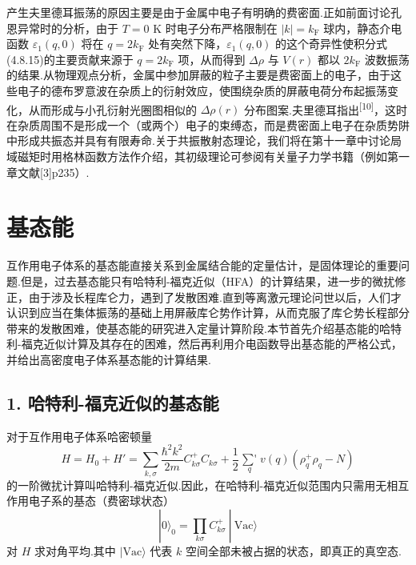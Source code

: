 产生夫里德耳振荡的原因主要是由于金属中电子有明确的费密面.正如前面讨论孔恩异常时的分析，由于 $T=0$ K 时电子分布严格限制在 $|k|=k_{\mathrm{F}}$ 球内，静态介电函数 $\varepsilon_{1}(q,0)$ 将在 $q=2k_{\mathrm{F}}$ 处有突然下降，$\varepsilon_{1}(q,0)$ 的这个奇异性使积分式(4.8.15)的主要贡献来源于 $q=2k_{\mathrm{F}}$ 项，从而得到 $\Delta\rho$ 与 $V(r)$ 都以 $2k_{\mathrm{F}}$ 波数振荡的结果.从物理观点分析，金属中参加屏蔽的粒子主要是费密面上的电子，由于这些电子的德布罗意波在杂质上的衍射效应，使围绕杂质的屏蔽电荷分布起振荡变化，从而形成与小孔衍射光圈图相似的 $\Delta\rho(r)$ 分布图案.夫里德耳指出\textsuperscript{[10]}，这时在杂质周围不是形成一个（或两个）电子的束缚态，而是费密面上电子在杂质势阱中形成共振态并具有有限寿命.关于共振散射态理论，我们将在第十一章中讨论局域磁矩时用格林函数方法作介绍，其初级理论可参阅有关量子力学书籍（例如第一章文献[3]p235）.

\section{基态能}

互作用电子体系的基态能直接关系到金属结合能的定量估计，是固体理论的重要问题.但是，过去基态能只有哈特利-福克近似（HFA）的计算结果，进一步的微扰修正，由于涉及长程库仑力，遇到了发散困难.直到等离激元理论问世以后，人们才认识到应当在集体振荡的基础上用屏蔽库仑势作计算，从而克服了库仑势长程部分带来的发散困难，使基态能的研究进入定量计算阶段.本节首先介绍基态能的哈特利-福克近似计算及其存在的困难，然后再利用介电函数导出基态能的严格公式，并给出高密度电子体系基态能的计算结果.

\subsection*{1. 哈特利-福克近似的基态能}

对于互作用电子体系哈密顿量
\begin{equation}
  H=H_{0}+H'=\sum_{k,\sigma}\frac{\hbar^{2}k^{2}}{2m}C_{k\sigma}^{+}C_{k\sigma}
  +\frac{1}{2}\mathop{{\sum}'}\limits_{q}v(q)\left(\rho_{q}^{+}\rho_{q}-N\right)
\end{equation}
的一阶微扰计算叫哈特利-福克近似.因此，在哈特利-福克近似范围内只需用无相互作用电子系的基态（费密球状态）
\begin{equation}
  |0\rangle_{0}=\prod_{k\sigma}C_{k\sigma}^{+}\ |\ \mathrm{Vac}\rangle
\end{equation}
对 $H$ 求对角平均.其中 $|\mathrm{Vac}\rangle$ 代表 $k$ 空间全部未被占据的状态，即真正的真空态.


